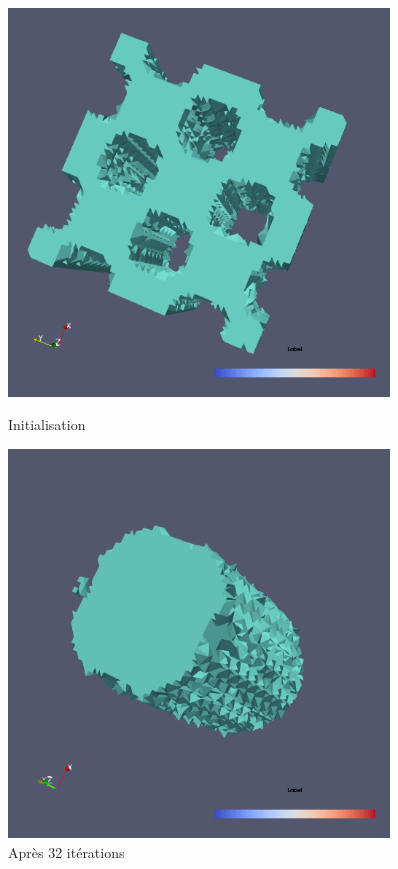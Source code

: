 \documentclass[11pt,a4paper]{article}
\begin{document}
\begin{figure}[H]
	\begin{minipage}{0.45\textwidth}
		\includegraphics[width=0.9\textwidth]{SansEl3DdistVraieiniTrouINI.png}
		\caption{Initialisation}
	\end{minipage}	
	\begin{minipage}{0.45\textwidth}
		\includegraphics[width=0.9\textwidth]{SansEl3DdistVraieiniTrouResit32.png}
		\caption{Après 32 itérations}
	\end{minipage}	
\end{figure}
\end{document}
